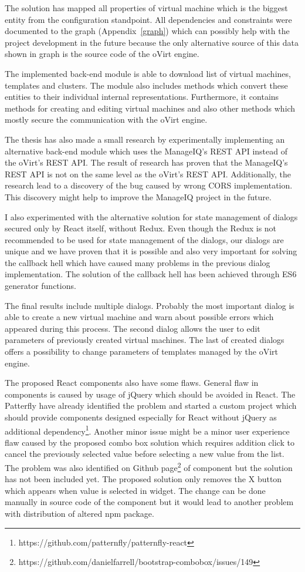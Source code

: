 The solution has mapped all properties of virtual machine which is the biggest entity from the configuration standpoint. All dependencies and constraints were documented to the graph (Appendix~\ref{graph}) which can possibly help with the project development in the future because the only alternative source of this data shown in graph is the source code of the oVirt engine.

The implemented back-end module is able to download list of virtual machines, templates and clusters. The module also includes methods which convert these entities to their individual internal representations. Furthermore, it contains methods for creating and editing virtual machines and also other methods which mostly secure the communication with the oVirt engine.

The thesis has also made a small research by experimentally implementing an alternative back-end module which uses the ManageIQ's REST API instead of the oVirt's REST API. The result of research has proven that the ManageIQ's REST API is not on the same level as the oVirt's REST API. Additionally, the research lead to a discovery of the bug caused by wrong CORS implementation. This discovery might help to improve the ManageIQ project in the future. 

I also experimented with the alternative solution for state management of dialogs secured only by React itself, without Redux. Even though the Redux is not recommended to be used for state management of the dialogs, our dialogs are unique and we have proven that it is possible and also very important for solving the callback hell which have caused many problems in the previous dialog implementation. The solution of the callback hell has been achieved through ES6 generator functions.

The final results include multiple dialogs. Probably the most important dialog is able to create a new virtual machine and warn about possible errors which appeared during this process. The second dialog allows the user to edit parameters of previously created virtual machines. The last of created dialogs offers a possibility to change parameters of templates managed by the oVirt engine.

The proposed React components also have some flaws. General flaw in components is caused by usage of jQuery which should be avoided in React. The Patterfly have already identified the problem and started a custom project which should provide components designed especially for React without jQuery as additional dependency\footnote{https://github.com/patternfly/patternfly-react}. Another minor issue might be a minor user experience flaw caused by the proposed combo box solution which requires addition click to cancel the previously selected value before selecting a new value from the list. The problem was also identified on Github page\footnote{https://github.com/danielfarrell/bootstrap-combobox/issues/149 } of component but the solution has not been included yet. The proposed solution only removes the X button which appears when value is selected in widget. The change can be done manually in source code of the component but it would lead to another problem with distribution of altered npm package.

